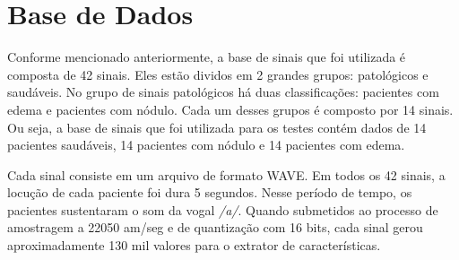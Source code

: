 \documentclass[a4paper,12pt,oneside]{report}
\begin{document}
\section{Base de Dados}
\hspace*{+15pt} Conforme mencionado anteriormente, a base de sinais que foi utilizada \'{e} composta de 42 sinais. Eles est\~{a}o dividos em 2 grandes grupos: patol\'{o}gicos e saud\'{a}veis. No grupo de sinais patol\'{o}gicos h\'{a} duas classifica\c{c}\~{o}es: pacientes com edema e pacientes com n\'{o}dulo. Cada um desses grupos \'{e} composto por 14 sinais. Ou seja, a base de sinais que foi utilizada para os testes cont\'{e}m dados de 14 pacientes saud\'{a}veis, 14 pacientes com n\'{o}dulo e 14 pacientes com edema. 
\\
\par Cada sinal consiste em um arquivo de formato WAVE. Em todos os 42 sinais, a locu\c{c}\~{a}o de cada paciente foi dura 5 segundos. Nesse per\'{i}odo de tempo, os pacientes sustentaram o som da vogal \emph{/a/}. Quando submetidos ao processo de amostragem a 22050 am/seg e de quantiza\c{c}\~{a}o com 16 bits, cada sinal gerou aproximadamente 130 mil valores para o extrator de caracter\'{i}sticas. 
\end{document}
